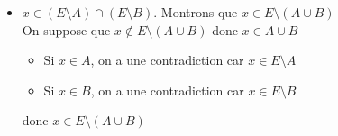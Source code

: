 \begin{prv}
\begin{enumerate}
\begin{itemize}
				\item $x \in (E\setminus A) \cap (E\setminus B)$. Montrons que $x \in  E \setminus(A\cup B)$ \\
					On suppose que $x \not\in E \setminus (A\cup B)$ donc $x \in A\cup B$ 
					\begin{itemize}
						\item Si $x \in A$, on a une contradiction car $x \in E\setminus A$
						\item Si $x \in B$, on a une contradiction car $x \in E\setminus B$
					\end{itemize}
					donc $x \in E \setminus(A\cup B)$
			\end{itemize}
	\end{enumerate}
\end{prv}

